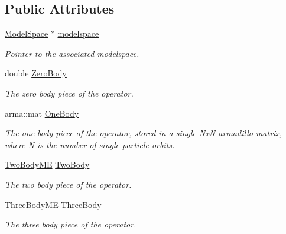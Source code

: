 \subsection*{Public Attributes}
\begin{DoxyCompactItemize}
\item 
\mbox{\label{classOperator_af08ef1c6d3ef38d08b4a6ea20b26ef22}} 
\hyperlink{classModelSpace}{Model\+Space} $\ast$ \hyperlink{classOperator_af08ef1c6d3ef38d08b4a6ea20b26ef22}{modelspace}
\begin{DoxyCompactList}\small\item\em Pointer to the associated modelspace. \end{DoxyCompactList}\item 
\mbox{\label{classOperator_a2f9f1109333a2485083cc7c090f9cd26}} 
double \hyperlink{classOperator_a2f9f1109333a2485083cc7c090f9cd26}{Zero\+Body}
\begin{DoxyCompactList}\small\item\em The zero body piece of the operator. \end{DoxyCompactList}\item 
\mbox{\label{classOperator_a14b1c78e0be45772aa57168c74d1b57c}} 
arma\+::mat \hyperlink{classOperator_a14b1c78e0be45772aa57168c74d1b57c}{One\+Body}
\begin{DoxyCompactList}\small\item\em The one body piece of the operator, stored in a single NxN armadillo matrix, where N is the number of single-\/particle orbits. \end{DoxyCompactList}\item 
\mbox{\label{classOperator_add51ac69970faff9936192fec4181e00}} 
\hyperlink{classTwoBodyME}{Two\+Body\+ME} \hyperlink{classOperator_add51ac69970faff9936192fec4181e00}{Two\+Body}
\begin{DoxyCompactList}\small\item\em The two body piece of the operator. \end{DoxyCompactList}\item 
\mbox{\label{classOperator_ac9d7e28ec1958d5065e12cbf0c0e3541}} 
\hyperlink{classThreeBodyME}{Three\+Body\+ME} \hyperlink{classOperator_ac9d7e28ec1958d5065e12cbf0c0e3541}{Three\+Body}
\begin{DoxyCompactList}\small\item\em The three body piece of the operator. \end{DoxyCompactList}\item 

\end{DoxyCompactItemize}

